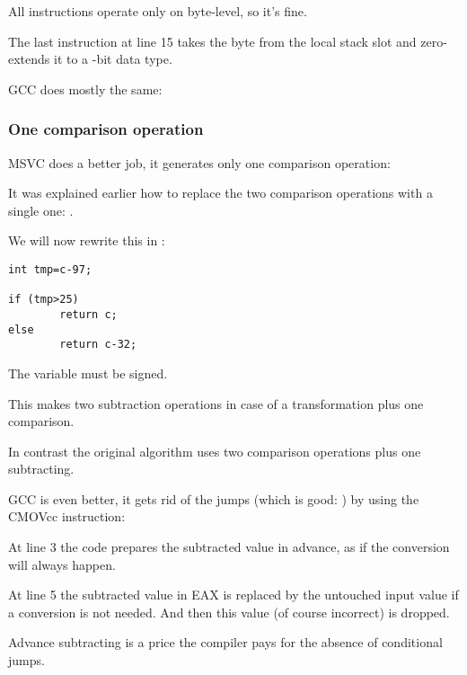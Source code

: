 All instructions operate only on byte-level, so it's fine.

The last  instruction at line 15 takes the byte from the local stack slot and zero-extends it to a -bit data type.

\NonOptimizing GCC does mostly the same:



\subsubsection{One comparison operation}
\label{toupper_one_comparison}

\Optimizing MSVC does a better job, it generates only one comparison operation:



It was explained earlier how to replace the two comparison operations with a single one: .

We will now rewrite this in \CCpp:

\begin{lstlisting}[style=customc]
int tmp=c-97;

if (tmp>25)
        return c;
else
        return c-32;
\end{lstlisting}

The  variable must be signed.

This makes two subtraction operations in case of a transformation plus one comparison.

In contrast the original algorithm uses two comparison operations plus one subtracting.

\Optimizing GCC is even better, it gets rid of the jumps (which is good: ) 
by using the CMOVcc instruction:



At line 3 the code prepares the subtracted value in advance, as if the conversion will always happen.

At line 5 the subtracted value in EAX is replaced by the untouched input value if a conversion is not needed.
And then this value (of course incorrect) is dropped.

Advance subtracting is a price the compiler pays for the absence of conditional jumps.

